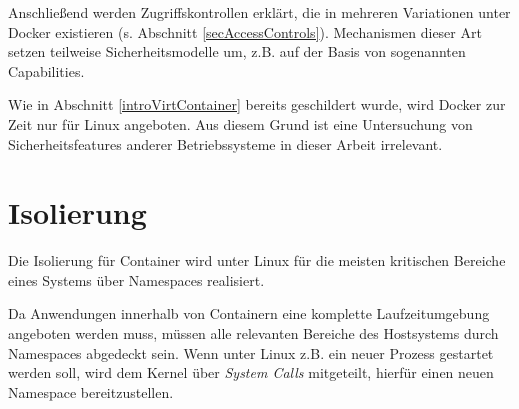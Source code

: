 \documentclass[../main.tex]{subfiles}
\begin{document}
	Anschließend werden Zugriffskontrollen erklärt, die in mehreren Variationen unter Docker existieren (s. Abschnitt \ref{secAccessControls}). Mechanismen dieser Art setzen teilweise Sicherheitsmodelle um, z.B. auf der Basis von sogenannten Capabilities.




	Wie in Abschnitt \ref{introVirtContainer} bereits geschildert wurde, wird Docker zur Zeit nur für Linux angeboten. Aus diesem Grund ist eine Untersuchung von Sicherheitsfeatures anderer Betriebssysteme in dieser Arbeit irrelevant.




	\section{Isolierung}
  \label{secIsolierung}
		Die Isolierung für Container wird unter Linux für die meisten kritischen Bereiche eines Systems über Namespaces realisiert.

		Da Anwendungen innerhalb von Containern eine komplette Laufzeitumgebung angeboten werden muss, müssen alle relevanten Bereiche des Hostsystems durch Namespaces abgedeckt sein.	Wenn unter Linux z.B. ein neuer Prozess gestartet werden soll, wird dem Kernel über \emph{System Calls} mitgeteilt, hierfür einen neuen Namespace bereitzustellen.
\end{document}
